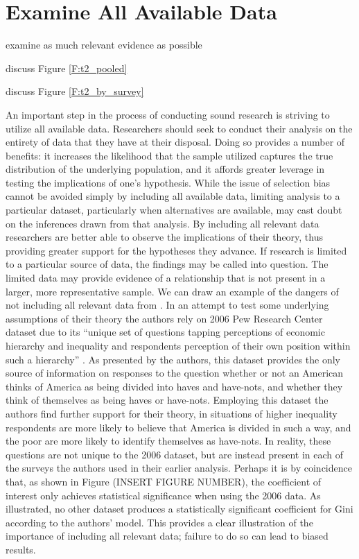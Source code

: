 
\section{Examine All Available Data}

examine as much relevant evidence as possible

discuss Figure \ref{F:t2_pooled}

discuss Figure \ref{F:t2_by_survey}

An important step in the process of conducting sound research is striving to utilize all available data. Researchers should seek to conduct their analysis on the entirety of data that they have at their disposal. Doing so provides a number of benefits:  it increases the likelihood that the sample utilized captures the true distribution of the underlying population, and it affords greater leverage in testing the implications of one’s hypothesis. While the issue of selection bias cannot be avoided simply by including all available data, limiting analysis to a particular dataset, particularly when alternatives are available, may cast doubt on the inferences drawn from that analysis. By including all relevant data researchers are better able to observe the implications of their theory, thus providing greater support for the hypotheses they advance.
If research is limited to a particular source of data, the findings may be called into question. The limited data may provide evidence of a relationship that is not present in a larger, more representative sample. We can draw an example of the dangers of not including all relevant data from \citet{Newman2015}.  In an attempt to test some underlying assumptions of their theory the authors rely on 2006 Pew Research Center dataset due to its “unique set of questions tapping perceptions of economic hierarchy and inequality and respondents perception of their own position within such a hierarchy” \citep{Newman2015 p.336}. As presented by the authors, this dataset provides the only source of information on responses to the question whether or not an American thinks of America as being divided into haves and have-nots, and whether they think of themselves as being haves or have-nots. Employing this dataset the authors find further support for their theory, in situations of higher inequality respondents are more likely to believe that America is divided in such a way, and the poor are more likely to identify themselves as have-nots. In reality, these questions are not unique to the 2006 dataset, but are instead present in each of the surveys the authors used in their earlier analysis. Perhaps it is by coincidence that, as shown in Figure (INSERT FIGURE NUMBER), the coefficient of interest only achieves statistical significance when using the 2006 data. As illustrated, no other dataset produces a statistically significant coefficient for Gini according to the authors’ model. This provides a clear illustration of the importance of including all relevant data; failure to do so can lead to biased results.
